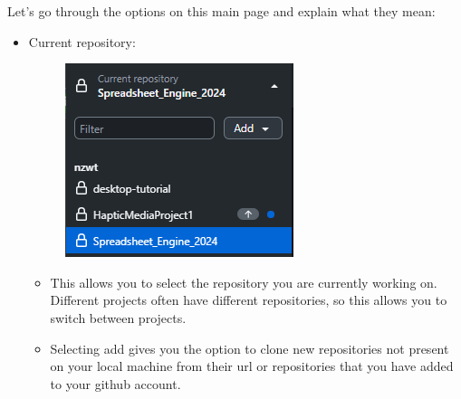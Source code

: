 \documentclass[10pt,twocolumn]{article}
\begin{document}
    Let's go through the options on this main page and explain what they mean:
    \begin{itemize}
        \item Current repository:
\begin{figure}
    \centering
    \includegraphics[width=0.5\linewidth]{repositories.png}
\end{figure}
        \begin{itemize}
                \item This allows you to select the repository you are currently working on. Different projects often have different repositories, so this allows you to switch between projects. 
                \item Selecting add gives you the option to clone new repositories not present on your local machine from their url or repositories that you have added to your github account.



\end{itemize}
\end{itemize}
\end{document}
